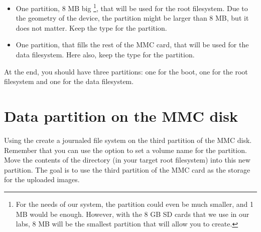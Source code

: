 \begin{itemize}

\item One partition, 8 MB big
  \footnote{For the needs of our system, the partition could even be
  much smaller, and 1 MB would be enough. However, with the 8 GB SD
  cards that we use in our labs, 8 MB will be the smallest partition
  that  will allow you to create.},
  that will be used for the root
  filesystem. Due to the geometry of the device, the partition might
  be larger than 8 MB, but it does not matter. Keep the 
  type for the partition.

\item One partition, that fills the rest of the MMC card, that will be
  used for the data filesystem. Here also, keep the  type
  for the partition.

\end{itemize}

At the end, you should have three partitions: one for the boot, one
for the root filesystem and one for the data filesystem.

\section{Data partition on the MMC disk}


Using the  create a journaled file system on the third
partition of the MMC disk. Remember that you can use the 
option to set a volume name for the partition. Move the contents of
the  directory (in your target root filesystem)
into this new partition. The goal is to use the third partition of the
MMC card as the storage for the uploaded images.

